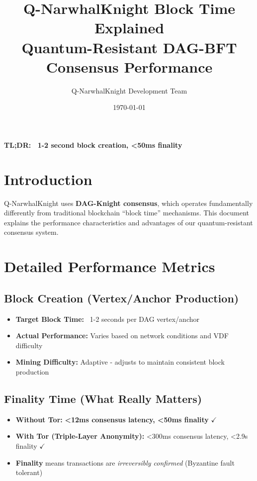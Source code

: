 \documentclass[12pt,a4paper]{article}
\title{\Huge\textbf{Q-NarwhalKnight Block Time Explained}\\
\Large Quantum-Resistant DAG-BFT Consensus Performance}
\author{Q-NarwhalKnight Development Team}
\date{\today}
\begin{document}
\maketitle

\begin{center}
\colorbox{quantumgreen!20}{\parbox{0.9\textwidth}{\centering\Large\textbf{TL;DR: ~1-2 second block creation, \textcolor{quantumgreen}{<50ms finality}}}}
\end{center}

\section{Introduction}

Q-NarwhalKnight uses \textbf{DAG-Knight consensus}, which operates fundamentally differently from traditional blockchain ``block time'' mechanisms. This document explains the performance characteristics and advantages of our quantum-resistant consensus system.

\section{Detailed Performance Metrics}

\subsection{Block Creation (Vertex/Anchor Production)}

\begin{itemize}
    \item \textbf{Target Block Time:} ~1-2 seconds per DAG vertex/anchor
    \item \textbf{Actual Performance:} Varies based on network conditions and VDF difficulty
    \item \textbf{Mining Difficulty:} Adaptive - adjusts to maintain consistent block production
\end{itemize}

\subsection{Finality Time (What Really Matters)}

\begin{tcolorbox}[colback=quantumgreen!10,colframe=quantumgreen!50,title=\textbf{Finality Performance}]
\begin{itemize}
    \item \textbf{Without Tor:} \textcolor{quantumgreen}{\textbf{<12ms consensus latency, <50ms finality}} $\checkmark$
    \item \textbf{With Tor (Triple-Layer Anonymity):} <300ms consensus latency, <2.9s finality $\checkmark$
    \item \textbf{Finality} means transactions are \textit{irreversibly confirmed} (Byzantine fault tolerant)
\end{itemize}
\end{tcolorbox}
\end{document}
